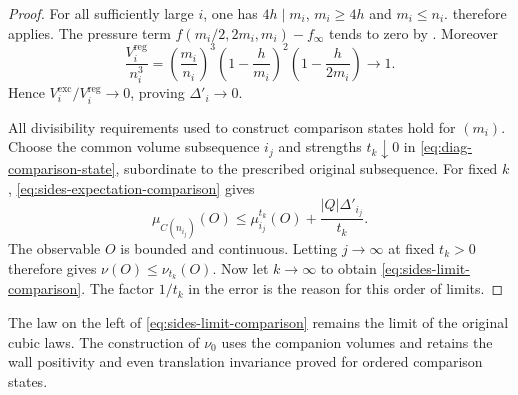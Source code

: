 \begin{proof}
For all sufficiently large $i$, one has $4h\mid m_i$, $m_i\ge4h$
and $m_i\le n_i$.  therefore
applies. The pressure term $f(m_i/2,2m_i,m_i)-f_\infty$ tends
to zero by . Moreover
\begin{equation}\label{eq:sides-volume-ratio}
 \frac{V_i^{\mathrm{reg}}}{n_i^3}
 =\left(\frac{m_i}{n_i}\right)^3
    \left(1-\frac h{m_i}\right)^2
    \left(1-\frac h{2m_i}\right)\longrightarrow1.
\end{equation}
Hence $V_i^{\mathrm{exc}}/V_i^{\mathrm{reg}}\to0$, proving
$\Delta'_i\to0$.

All divisibility requirements used to construct comparison states
hold for $(m_i)$. Choose the common volume subsequence $i_j$ and
strengths $t_k\downarrow0$ in \eqref{eq:diag-comparison-state},
subordinate to the prescribed original subsequence. For fixed $k$,
\eqref{eq:sides-expectation-comparison} gives
\[
 \mu_{C(n_{i_j})}(O)\le\mu_{i_j}^{t_k}(O)
                         +\frac{|Q|\Delta'_{i_j}}{t_k}.
\]
The observable $O$ is bounded and continuous. Letting $j\to\infty$
at fixed $t_k>0$ therefore gives $\nu(O)\le\nu_{t_k}(O)$.
Now let $k\to\infty$ to obtain \eqref{eq:sides-limit-comparison}.
The factor $1/t_k$ in the error is the reason for this order of limits.
\end{proof}

The law on the left of \eqref{eq:sides-limit-comparison} remains the
limit of the original cubic laws. The construction of $\nu_0$ uses
the companion volumes and retains the wall positivity and even
translation invariance proved for ordered comparison states.
